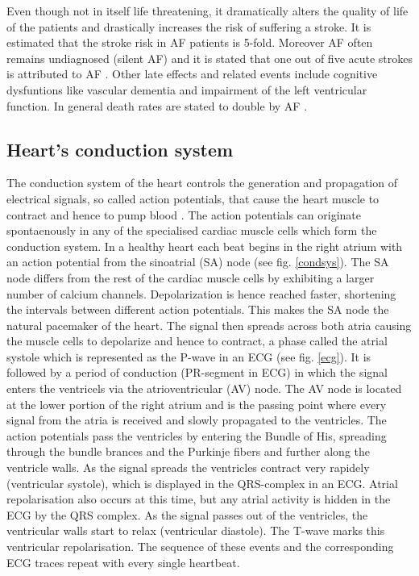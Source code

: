 \documentclass[type=dr, dr=rernat, accentcolor=tud7b,colorbacktitle, bigchapter, openright, twoside, 12pt ]{tudthesis}
\begin{document}
Even though not in itself life threatening, it dramatically alters the quality of life of the patients and drastically increases the risk 
of suffering a stroke. It is estimated that the stroke risk in AF patients is 5-fold. Moreover AF often remains undiagnosed (silent AF) and 
it is stated that one out of five acute strokes is attributed to AF \cite{ESC10}. Other late effects and related events include cognitive 
dysfuntions like vascular dementia and impairment of the left ventricular function. In general death rates are stated to double by 
AF \cite{ESC10}.\newline



\subsection*{Heart's conduction system}

The conduction system of the heart controls the generation and propagation of electrical signals, so called action potentials, that cause 
the heart muscle to contract and hence to pump blood \cite{Med}. The action potentials can originate spontaenously in any of the specialised 
cardiac muscle cells which form the conduction system. In a healthy heart each beat begins in the right atrium with an action potential 
from the sinoatrial (SA) node (see fig. \ref{condsys}). The SA node differs from the rest of the cardiac muscle cells by exhibiting a larger 
number of calcium channels. Depolarization is hence reached faster, shortening the intervals between different action potentials. This makes 
the SA node the natural pacemaker of the heart.
The signal then spreads across both atria causing the muscle cells to depolarize and hence to contract, a phase called the atrial systole 
which is represented as the P-wave in an ECG (see fig. \ref{ecg}). It is followed by a period of conduction (PR-segment in ECG) in which 
the signal enters the ventricels via the atrioventricular (AV) node. The AV node is located at the lower portion of the right atrium and is 
the passing point where every signal from the atria is received and slowly propagated to the ventricles. The action potentials pass the 
ventricles 
by entering the Bundle of His, spreading through the bundle brances and the Purkinje fibers and further along the ventricle walls. As the 
signal spreads the ventricles contract very rapidely (ventricular systole), which is displayed in the QRS-complex in an ECG. Atrial 
repolarisation also occurs at this time, but any atrial activity is hidden in the ECG by the QRS complex. As the signal passes out of the 
ventricles, the ventricular walls start to relax (ventricular diastole). The T-wave marks this ventricular repolarisation. The sequence of 
these events and the corresponding ECG traces repeat with every single heartbeat.\newline
\end{document}
